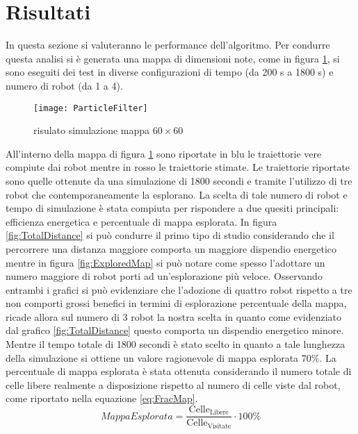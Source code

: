 \section{Risultati}
\label{sec:risultati}
In questa sezione si valuteranno le performance dell'algoritmo.
Per condurre questa analisi si è generata una mappa di dimensioni note, come  in
figura \ref{fig:maptest}, si sono eseguiti dei test in diverse configurazioni
di tempo (da 200 \si{\second} a 1800 \si{\second}) e numero di robot
(da 1 a 4).
\begin{figure}[!htb]
	\centering
	\texttt{[image: ParticleFilter]}
	\caption{risulato simulazione mappa $60\times60$}
	\label{fig:maptest}
\end{figure}
All'interno della mappa di figura \ref{fig:maptest} sono riportate in blu le
traiettorie vere compiute dai robot mentre in rosso le traiettorie stimate.
Le traiettorie riportate sono quelle ottenute da una simulazione di 1800
secondi e tramite l'utilizzo di tre robot che contemporaneamente la esplorano.
La scelta di tale numero di robot e tempo di simulazione è stata compiuta per
rispondere a due quesiti principali: efficienza energetica e percentuale di
mappa esplorata.
In figura \ref{fig:TotalDistance} si può condurre il primo tipo di studio
considerando che il percorrere una distanza maggiore comporta un maggiore
dispendio energetico mentre in figura \ref{fig:ExploredMap} si può notare come
spesso l'adottare un numero maggiore di robot porti ad un'esplorazione più
veloce.
Osservando entrambi i grafici si può evidenziare che l'adozione di quattro robot
rispetto a tre non comporti grossi benefici in termini di esplorazione
percentuale della mappa, ricade allora sul numero di 3 robot la nostra scelta in
quanto come evidenziato dal grafico \ref{fig:TotalDistance} questo comporta un
dispendio energetico minore.
Mentre il tempo totale di 1800 secondi è stato scelto in quanto a tale lunghezza
della  simulazione si ottiene un valore ragionevole di mappa esplorata $70\%$.
La percentuale di mappa esplorata è stata ottenuta considerando il numero totale
di celle libere realmente a disposizione rispetto al numero di celle viste dal
robot, come riportato nella equazione \eqref{eq:FracMap}.
%
\begin{equation}
Mappa Esplorata = \frac{\text{Celle}_{\text{Libere}}}{\text{Celle}_{\text{Visitate}}} \cdot 100 \%
\label{eq:FracMap}
\end{equation}

